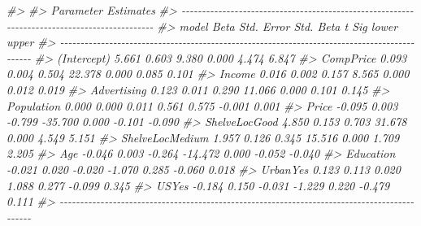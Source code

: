 \documentclass[
]{article}
\newenvironment{Shaded}{\begin{snugshade}}{\end{snugshade}}
\newcommand{\CommentTok}[1]{\textcolor[rgb]{0.56,0.35,0.01}{\textit{#1}}}
\begin{document}
\begin{Shaded}
\begin{Highlighting}[]
\CommentTok{\#\textgreater{} }
\CommentTok{\#\textgreater{}                                      Parameter Estimates                                      }
\CommentTok{\#\textgreater{} {-}{-}{-}{-}{-}{-}{-}{-}{-}{-}{-}{-}{-}{-}{-}{-}{-}{-}{-}{-}{-}{-}{-}{-}{-}{-}{-}{-}{-}{-}{-}{-}{-}{-}{-}{-}{-}{-}{-}{-}{-}{-}{-}{-}{-}{-}{-}{-}{-}{-}{-}{-}{-}{-}{-}{-}{-}{-}{-}{-}{-}{-}{-}{-}{-}{-}{-}{-}{-}{-}{-}{-}{-}{-}{-}{-}{-}{-}{-}{-}{-}{-}{-}{-}{-}{-}{-}{-}{-}{-}{-}{-}{-}}
\CommentTok{\#\textgreater{}           model      Beta    Std. Error    Std. Beta       t        Sig      lower     upper }
\CommentTok{\#\textgreater{} {-}{-}{-}{-}{-}{-}{-}{-}{-}{-}{-}{-}{-}{-}{-}{-}{-}{-}{-}{-}{-}{-}{-}{-}{-}{-}{-}{-}{-}{-}{-}{-}{-}{-}{-}{-}{-}{-}{-}{-}{-}{-}{-}{-}{-}{-}{-}{-}{-}{-}{-}{-}{-}{-}{-}{-}{-}{-}{-}{-}{-}{-}{-}{-}{-}{-}{-}{-}{-}{-}{-}{-}{-}{-}{-}{-}{-}{-}{-}{-}{-}{-}{-}{-}{-}{-}{-}{-}{-}{-}{-}{-}{-}}
\CommentTok{\#\textgreater{}     (Intercept)     5.661         0.603                   9.380    0.000     4.474     6.847 }
\CommentTok{\#\textgreater{}       CompPrice     0.093         0.004        0.504     22.378    0.000     0.085     0.101 }
\CommentTok{\#\textgreater{}          Income     0.016         0.002        0.157      8.565    0.000     0.012     0.019 }
\CommentTok{\#\textgreater{}     Advertising     0.123         0.011        0.290     11.066    0.000     0.101     0.145 }
\CommentTok{\#\textgreater{}      Population     0.000         0.000        0.011      0.561    0.575    {-}0.001     0.001 }
\CommentTok{\#\textgreater{}           Price    {-}0.095         0.003       {-}0.799    {-}35.700    0.000    {-}0.101    {-}0.090 }
\CommentTok{\#\textgreater{}   ShelveLocGood     4.850         0.153        0.703     31.678    0.000     4.549     5.151 }
\CommentTok{\#\textgreater{} ShelveLocMedium     1.957         0.126        0.345     15.516    0.000     1.709     2.205 }
\CommentTok{\#\textgreater{}             Age    {-}0.046         0.003       {-}0.264    {-}14.472    0.000    {-}0.052    {-}0.040 }
\CommentTok{\#\textgreater{}       Education    {-}0.021         0.020       {-}0.020     {-}1.070    0.285    {-}0.060     0.018 }
\CommentTok{\#\textgreater{}        UrbanYes     0.123         0.113        0.020      1.088    0.277    {-}0.099     0.345 }
\CommentTok{\#\textgreater{}           USYes    {-}0.184         0.150       {-}0.031     {-}1.229    0.220    {-}0.479     0.111 }
\CommentTok{\#\textgreater{} {-}{-}{-}{-}{-}{-}{-}{-}{-}{-}{-}{-}{-}{-}{-}{-}{-}{-}{-}{-}{-}{-}{-}{-}{-}{-}{-}{-}{-}{-}{-}{-}{-}{-}{-}{-}{-}{-}{-}{-}{-}{-}{-}{-}{-}{-}{-}{-}{-}{-}{-}{-}{-}{-}{-}{-}{-}{-}{-}{-}{-}{-}{-}{-}{-}{-}{-}{-}{-}{-}{-}{-}{-}{-}{-}{-}{-}{-}{-}{-}{-}{-}{-}{-}{-}{-}{-}{-}{-}{-}{-}{-}{-}}
\end{Highlighting}
\end{Shaded}
\end{document}
